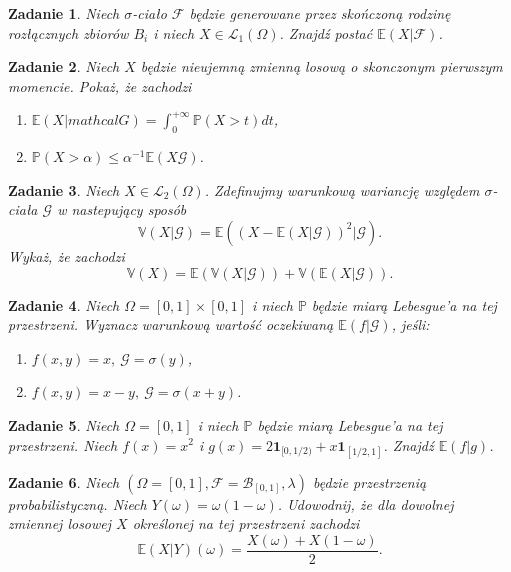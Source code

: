 \documentclass{mwart}
\newtheorem{zd}{Zadanie}
\begin{document}
\begin{zd}
Niech $\sigma$-ciało $\mathcal{F}$ będzie generowane przez skończoną rodzinę rozłącznych zbiorów $B_i$ i niech $X\in \mathcal{L}_1\left(\Omega\right)$. Znajdź postać $\mathbb{E}\left(X|\mathcal{F}\right)$.
\end{zd}

\begin{zd}
Niech $X$ będzie nieujemną zmienną losową o skonczonym pierwszym momencie. Pokaż, że zachodzi
\begin{enumerate}
\item $\mathbb{E}\left(X|mathcal{G}\right)= \int_0^{+\infty}\mathbb{P}\left(X > t\right)dt$,
\item $\mathbb{P}\left(X > \alpha\right)\leq \alpha^{-1}\mathbb{E}\left(X\mathcal{G}\right)$.
\end{enumerate}
\end{zd}

\begin{zd}
Niech $X \in \mathcal{L}_2\left(\Omega\right)$. Zdefinujmy warunkową wariancję względem $\sigma$- ciała $\mathcal{G}$ w nastepujący sposób
\begin{displaymath}
\mathbb{V}\left(X|\mathcal{G}\right) = \mathbb{E}\left(\left(X - \mathbb{E}\left(X|\mathcal{G}\right)\right)^2|\mathcal{G}\right).
\end{displaymath}
Wykaż, że zachodzi
\begin{displaymath}
\mathbb{V}\left(X\right) = \mathbb{E}\left(\mathbb{V}\left(X|\mathcal{G}\right)\right) + \mathbb{V}\left(\mathbb{E}\left(X|\mathcal{G}\right)\right).
\end{displaymath}
\end{zd}

\begin{zd}
Niech $\Omega = [0,1]\times[0,1]$ i niech $\mathbb{P}$ będzie miarą Lebesgue'a na tej przestrzeni. Wyznacz warunkową wartość oczekiwaną $\mathbb{E}\left(f|\mathcal{G}\right)$, jeśli:
\begin{enumerate}
\item $f(x,y) = x,\ \mathcal{G} = \sigma(y)$,
\item $f(x,y) = x - y,\ \mathcal{G} = \sigma(x+y)$.
\end{enumerate}
\end{zd}
\begin{zd}
Niech $\Omega = [0, 1]$ i niech $\mathbb{P}$ będzie miarą Lebesgue'a na tej przestrzeni. Niech $f(x) = x^2$ i $g(x) = 2\pmb{1}_{[0, 1/2)} + x\pmb{1}_{[1/2, 1]}$. Znajdź $\mathbb{E}\left(f|g\right)$.
\end{zd}
\begin{zd}
	Niech $(\Omega = [0,1], \mathcal{F} = \mathcal{B}_{[0,1]}, \lambda)$ będzie przestrzenią probabilistyczną. Niech $Y(\omega) = \omega(1-\omega)$. Udowodnij, że dla dowolnej zmiennej losowej $X$ określonej na tej przestrzeni zachodzi
	\begin{displaymath}
	 \mathbb{E}(X|Y)(\omega) = \frac{X(\omega) + X(1-\omega)}{2}.
	\end{displaymath}
\end{zd}
\end{document}
